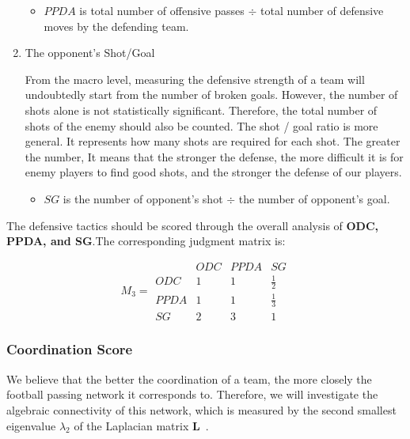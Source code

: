 \documentclass{mcmthesis}
\begin{document}
\begin{enumerate}
	\begin{itemize}
		\item $PPDA$ is total number of offensive passes $\div$ total number of defensive moves by the defending team.
	\end{itemize}

	\item The opponent's Shot/Goal
	
	From the macro level, measuring the defensive strength of a team will undoubtedly start from the number of broken goals.  However, the number of shots alone is not statistically significant. Therefore, the total number of shots of the enemy should also be counted. The shot / goal ratio is more general. It represents how many shots are required for each shot. The greater the number,  It means that the stronger the defense, the more difficult it is for enemy players to find good shots, and the stronger the defense of our players.

	\begin{itemize}
		\item $SG$ is the number of opponent's shot $\div$ the number of opponent's goal.
	\end{itemize}
	\end{enumerate}
	The defensive tactics should be scored through the overall analysis of \textbf{ODC, PPDA, and SG}.The corresponding judgment matrix is:

	\begin{equation}\label{mat:3}
		M_{3}=
	  \begin{matrix}
		& ODC & PPDA & SG\\
   		ODC & 1 & 1 & \frac{1}{2} \\
   		PPDA & 1 & 1 & \frac{1}{3} \\
   		SG & 2 & 3 & 1
  	\end{matrix}
	\end{equation}

\subsubsection{Coordination Score}
	We believe that the better the coordination of a team, the more closely the football passing network it corresponds to.  Therefore, we will investigate the algebraic connectivity of this network, which is measured by the second smallest eigenvalue $\lambda_{2}$ of the Laplacian matrix $\textbf{L}$~\cite{First}.
\end{document}
